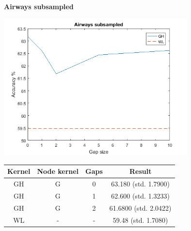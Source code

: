 \documentclass{article}
\begin{document}
\textbf{Airways subsampled}\\
\begin{minipage}{0.6\linewidth}
	\hspace*{-1in}
	\includegraphics[width=10cm]{airways}
	\label{fig:airways}
\end{minipage}
\begin{minipage}[c]{0.5\linewidth}
	
	\centering
	\begin{tabular}{c|c|c|c}
		Kernel & Node kernel & Gaps & Result\\
		\hline
		GH & G & 0 & 63.180 (std. 1.7900)\\
		GH & G & 1 & 62.600 (std. 1.3233)\\
		GH & G & 2 & 61.6800 (std. 2.0422)\\
		WL & - & - & 59.48 (std. 1.7080)
	\end{tabular}
	\label{table:airways}
\end{minipage}
\end{document}
